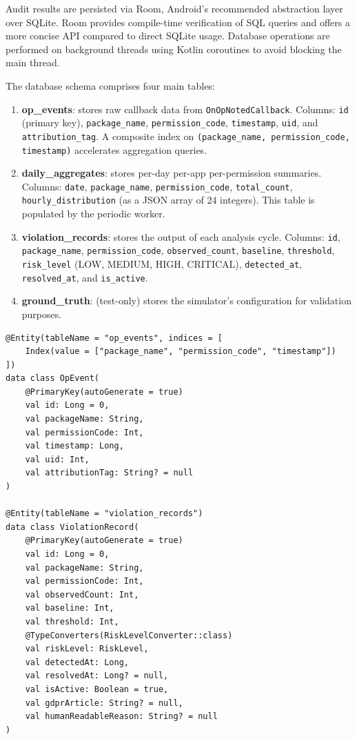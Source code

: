 Audit results are persisted via Room, Android's recommended abstraction layer over SQLite. Room provides compile-time verification of SQL queries and offers a more concise API compared to direct SQLite usage. Database operations are performed on background threads using Kotlin coroutines to avoid blocking the main thread.

The database schema comprises four main tables:

\begin{enumerate}
\item \textbf{op\_events}: stores raw callback data from \texttt{OnOpNotedCallback}. Columns: \texttt{id} (primary key), \texttt{package\_name}, \texttt{permission\_code}, \texttt{timestamp}, \texttt{uid}, and \texttt{attribution\_tag}. A composite index on \texttt{(package\_name, permission\_code, timestamp)} accelerates aggregation queries.
\item \textbf{daily\_aggregates}: stores per-day per-app per-permission summaries. Columns: \texttt{date}, \texttt{package\_name}, \texttt{permission\_code}, \texttt{total\_count}, \texttt{hourly\_distribution} (as a JSON array of 24 integers). This table is populated by the periodic worker.
\item \textbf{violation\_records}: stores the output of each analysis cycle. Columns: \texttt{id}, \texttt{package\_name}, \texttt{permission\_code}, \texttt{observed\_count}, \texttt{baseline}, \texttt{threshold}, \texttt{risk\_level} (LOW, MEDIUM, HIGH, CRITICAL), \texttt{detected\_at}, \texttt{resolved\_at}, and \texttt{is\_active}.
\item \textbf{ground\_truth}: (test-only) stores the simulator's configuration for validation purposes.
\end{enumerate}

\begin{lstlisting}[caption=Room entities]
@Entity(tableName = "op_events", indices = [
    Index(value = ["package_name", "permission_code", "timestamp"])
])
data class OpEvent(
    @PrimaryKey(autoGenerate = true)
    val id: Long = 0,
    val packageName: String,
    val permissionCode: Int,
    val timestamp: Long,
    val uid: Int,
    val attributionTag: String? = null
)

@Entity(tableName = "violation_records")
data class ViolationRecord(
    @PrimaryKey(autoGenerate = true)
    val id: Long = 0,
    val packageName: String,
    val permissionCode: Int,
    val observedCount: Int,
    val baseline: Int,
    val threshold: Int,
    @TypeConverters(RiskLevelConverter::class)
    val riskLevel: RiskLevel,
    val detectedAt: Long,
    val resolvedAt: Long? = null,
    val isActive: Boolean = true,
    val gdprArticle: String? = null,
    val humanReadableReason: String? = null
)
\end{lstlisting}

